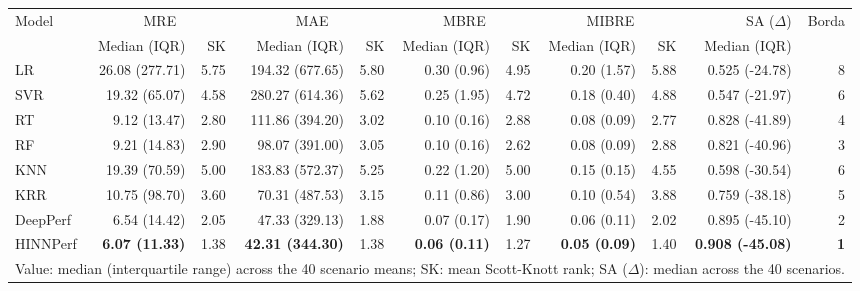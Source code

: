 \begin{tabular}{lrrrrrrrrrr}
\toprule
Model & \multicolumn{2}{c}{MRE} & \multicolumn{2}{c}{MAE} & \multicolumn{2}{c}{MBRE} & \multicolumn{2}{c}{MIBRE} & SA ($\Delta$) & Borda \\
 & Median (IQR) & SK & Median (IQR) & SK & Median (IQR) & SK & Median (IQR) & SK & Median (IQR) &  \\
\midrule
LR & 26.08 (277.71) & 5.75 & 194.32 (677.65) & 5.80 & 0.30 (0.96) & 4.95 & 0.20 (1.57) & 5.88 & 0.525 (-24.78) & 8 \\
SVR & 19.32 (65.07) & 4.58 & 280.27 (614.36) & 5.62 & 0.25 (1.95) & 4.72 & 0.18 (0.40) & 4.88 & 0.547 (-21.97) & 6 \\
RT & 9.12 (13.47) & 2.80 & 111.86 (394.20) & 3.02 & 0.10 (0.16) & 2.88 & 0.08 (0.09) & 2.77 & 0.828 (-41.89) & 4 \\
RF & 9.21 (14.83) & 2.90 & 98.07 (391.00) & 3.05 & 0.10 (0.16) & 2.62 & 0.08 (0.09) & 2.88 & 0.821 (-40.96) & 3 \\
KNN & 19.39 (70.59) & 5.00 & 183.83 (572.37) & 5.25 & 0.22 (1.20) & 5.00 & 0.15 (0.15) & 4.55 & 0.598 (-30.54) & 6 \\
KRR & 10.75 (98.70) & 3.60 & 70.31 (487.53) & 3.15 & 0.11 (0.86) & 3.00 & 0.10 (0.54) & 3.88 & 0.759 (-38.18) & 5 \\
DeepPerf & 6.54 (14.42) & 2.05 & 47.33 (329.13) & 1.88 & 0.07 (0.17) & 1.90 & 0.06 (0.11) & 2.02 & 0.895 (-45.10) & 2 \\
HINNPerf & \textbf{6.07 (11.33)} & 1.38 & \textbf{42.31 (344.30)} & 1.38 & \textbf{0.06 (0.11)} & 1.27 & \textbf{0.05 (0.09)} & 1.40 & \textbf{0.908 (-45.08)} & \textbf{1} \\
\bottomrule
\multicolumn{11}{l}{Value: median (interquartile range) across the 40 scenario means; SK: mean Scott-Knott rank; SA ($\Delta$): median across the 40 scenarios.} \\
\end{tabular}
